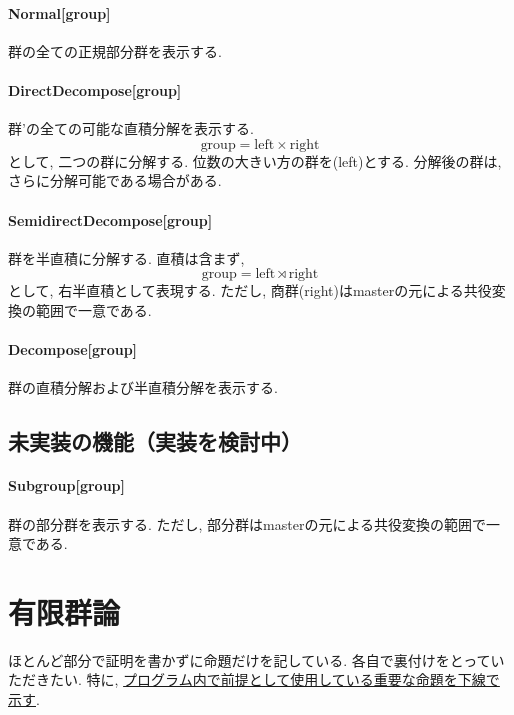 \documentclass[11pt, a4paper]{jsarticle}
\begin{document}
\paragraph{Normal[group]}
群の全ての正規部分群を表示する.

\paragraph{DirectDecompose[group]}
群'の全ての可能な直積分解を表示する.
\begin{equation}
\text{group} = \text{left} \times \text{right}
\end{equation}
として, 二つの群に分解する.
位数の大きい方の群を(left)とする.
分解後の群は, さらに分解可能である場合がある.

\paragraph{SemidirectDecompose[group]}
群を半直積に分解する.
直積は含まず,
\begin{equation}
\text{group} = \text{left} \rtimes \text{right}
\end{equation}
として, 右半直積として表現する.
ただし, 商群(right)はmasterの元による共役変換の範囲で一意である.

\paragraph{Decompose[group]}
群の直積分解および半直積分解を表示する.

\subsection{未実装の機能（実装を検討中）}

\paragraph{Subgroup[group]}
群の部分群を表示する.
ただし, 部分群はmasterの元による共役変換の範囲で一意である.

\newpage
\section{有限群論}
ほとんど部分で証明を書かずに命題だけを記している.
各自で裏付けをとっていただきたい.
特に, \uline{プログラム内で前提として使用している重要な命題を下線で示す}.
\end{document}
